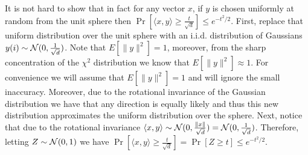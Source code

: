 \documentclass{article}
\begin{document}
It is not hard to show that in fact for any vector $x$, if $y$ is chosen uniformly at random from the unit sphere 
then $\Pr[ \langle x,y \rangle  \ge \frac{t}{\sqrt{d}}] \le e^{-t^2/2}$.
First, replace that uniform distribution over the unit sphere with an i.i.d. distribution of Gaussians $y(i)\sim {\mathcal{N}}(0,\frac{1}{\sqrt{d}})$.
Note that $E[\|y\|^2] = 1$, moreover, from the sharp concentration of the $\chi^2$ distribution we know that $E[\|y\|^2] \approx 1$.
For convenience we will assume that $E[\|y\|^2] = 1$ and will ignore the small inaccuracy.
Moreover, due to the rotational invariance of the Gaussian distribution we have that any direction is equally likely and thus this
new distribution approximates the uniform distribution over the sphere.
Next, notice that due to the rotational invariance $\langle x,y \rangle \sim {\mathcal{N}}(0,\frac{\|x\|}{\sqrt{d}}) = {\mathcal{N}}(0,\frac{1}{\sqrt{d}})$.
Therefore, letting $Z \sim {\mathcal{N}}(0,1)$ we have $\Pr[ \langle x,y \rangle  \ge \frac{t}{\sqrt{d}}] = \Pr[Z \ge t] \le e^{-t^2/2}$.







\end{document}
